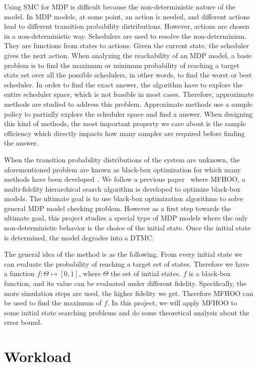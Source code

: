 \documentclass[11pt]{article}
\begin{document}
Using SMC for MDP is difficult because the non-deterministic nature of the model. In MDP models, at some point, an action is needed, and different actions lead to different transition probability distributions. However, actions are chosen in a non-deterministic way. Schedulers are used to resolve the non-determinism. They are functions from states to actions. Given the current state, the scheduler gives the next action. When analyzing the reachability of an MDP model, a basic problem is to find the maximum or minimum probability of reaching a target state set over all the possible schedulers, in other words, to find the worst or best scheduler. In order to find the exact answer, the algorithm have to explore the entire scheduler space, which is not feasible in most cases. Therefore, approximate methods are studied to address this problem. Approximate methods use a sample policy to partially explore the scheduler space and find a answer. When designing this kind of methods, the most important property we care about is the sample efficiency which directly impacts how many samples are required before finding the answer.

When the transition probability distributions of the system are unknown, the aforementioned problem are known as black-box optimization for which many methods have been developed~\cite{bubeck2011x, sen2019noisy}. We follow a previous paper~\cite{sen2019noisy} where MFHOO, a multi-fidelity hierarchical search algorithm is developed to optimize black-box models. The ultimate goal is to use black-box optimization algorithms to solve general MDP model checking problem. However as a first step towards the ultimate goal, this project studies a special type of MDP models where the only non-deterministic behavior is the choice of the initial state. Once the initial state is determined, the model degrades into a DTMC.

The general idea of the method is as the following. From every initial state we can evaluate the probability of reaching a target set of states. Therefore we have a function $f:\mathbb{\Theta} \mapsto [0,1]$, where $\mathbb{\Theta}$ the set of initial states. $f$ is a black-box function, and its value can be evaluated under different fidelity. Specifically, the more simulation steps are used, the higher fidelity we get. Therefore MFHOO can be used to find the maximum of $f$. In this project, we will apply MFHOO to some initial state searching problems and do some theoretical analysis about the error bound.

\section{Workload}
\end{document}
